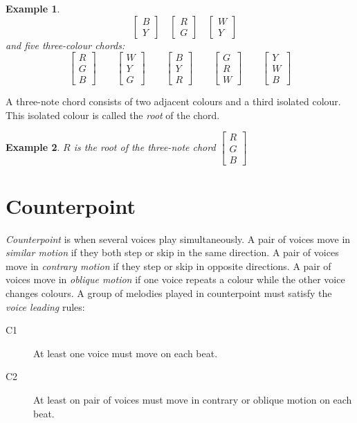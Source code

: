 \documentclass{scrartcl}
\newtheorem{example}{Example}
\begin{document}
\begin{example}
\begin{equation}
\quad
\begin{bmatrix}
B \\ Y
\end{bmatrix}
\quad
\begin{bmatrix}
R \\ G
\end{bmatrix}
\quad
\begin{bmatrix}
W \\ Y
\end{bmatrix}
\end{equation}
and five three-colour chords:
\begin{equation}\nonumber
\begin{bmatrix}
R \\ G \\ B
\end{bmatrix}
\qquad
\begin{bmatrix}
W \\ Y \\ G
\end{bmatrix}
\qquad
\begin{bmatrix}
B \\ Y \\ R
\end{bmatrix}
\qquad
\begin{bmatrix}
G \\ R \\ W
\end{bmatrix}
\qquad
\begin{bmatrix}
Y \\ W \\ B
\end{bmatrix}
\end{equation}
\end{example}
A three-note chord consists of two adjacent colours and a third isolated colour. This isolated colour is called the \emph{root} of the chord.
\begin{example}
$R$ is the root of the three-note chord $\begin{bmatrix} R \\ G \\ B \end{bmatrix}$
\end{example}

\section{Counterpoint}
\emph{Counterpoint} is when several voices play simultaneously. A pair of voices move in \emph{similar motion} if they both step or skip in the same direction. A pair of voices move in \emph{contrary motion} if they step or skip in opposite directions.  A pair of voices move in \emph{oblique motion} if one voice repeats a colour while the other voice changes colours.  A group of melodies played in counterpoint must satisfy the \emph{voice leading} rules:
\begin{description}
	\item[C1] At least one voice must move on each beat.
	\item[C2] At least on pair of voices must move in contrary or oblique motion on each beat.
\end{description}
\end{document}
